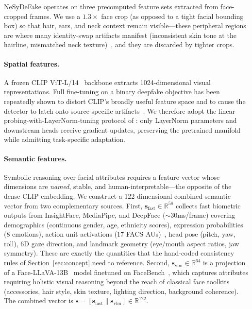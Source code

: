 \documentclass{article}
\begin{document}
NeSyDeFake operates on three precomputed feature sets extracted from face-cropped frames. We use a $1.3{\times}$ face crop (as opposed to a tight facial bounding box) so that hair, ears, and neck context remain visible---these peripheral regions are where many identity-swap artifacts manifest (inconsistent skin tone at the hairline, mismatched neck texture)~\citep{li2020face,zhao2021multi}, and they are discarded by tighter crops.

\paragraph{Spatial features.}
A frozen CLIP ViT-L/14~\citep{radford2021clip} backbone extracts 1024-dimensional visual representations. Full fine-tuning on a binary deepfake objective has been repeatedly shown to distort CLIP's broadly useful feature space and to cause the detector to latch onto source-specific artifacts~\citep{gend,ojha2023towards}. We therefore adopt the linear-probing-with-LayerNorm-tuning protocol of \citet{gend}: only LayerNorm parameters and downstream heads receive gradient updates, preserving the pretrained manifold while admitting task-specific adaptation.

\paragraph{Semantic features.}
Symbolic reasoning over facial attributes requires a feature vector whose dimensions are \emph{named}, stable, and human-interpretable---the opposite of the dense CLIP embedding. We construct a 122-dimensional combined semantic vector from two complementary sources. First, $\bm{s}_\text{fast} \in \mathbb{R}^{58}$ collects fast biometric outputs from InsightFace, MediaPipe, and DeepFace (${\sim}30$ms/frame) covering demographics (continuous gender, age, ethnicity scores), expression probabilities (8 emotions), action unit activations (17 FACS AUs)~\citep{ekman1978facial}, head pose (pitch, yaw, roll), 6D gaze direction, and landmark geometry (eye/mouth aspect ratios, jaw symmetry). These are exactly the quantities that the hand-coded consistency rules of Section~\ref{sec:concept} need to reference. Second, $\bm{s}_\text{vlm} \in \mathbb{R}^{64}$ is a projection of a Face-LLaVA-13B~\citep{faceLLaVA} model finetuned on FaceBench~\citep{facebench}, which captures attributes requiring holistic visual reasoning beyond the reach of classical face toolkits (accessories, hair style, skin texture, lighting direction, background coherence). The combined vector is $\bm{s} = [\bm{s}_\text{fast} \| \bm{s}_\text{vlm}] \in \mathbb{R}^{122}$.
\end{document}
